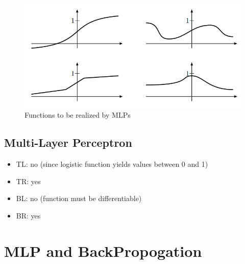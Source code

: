 \documentclass[12pt]{article}
\providecommand{\tightlist}{%
	\setlength{\itemsep}{0pt}\setlength{\parskip}{0pt}}
\begin{document}
\begin{figure}
	\centering

	\includegraphics[width=.75\textwidth]{fig/2018-03-19-13-57-32.png}
	\caption{Functions to be realized by MLPs} \label{fig:mlp3}
\end{figure}

\subsection{Multi-Layer Perceptron}

\begin{itemize}
	\tightlist
	\item TL: no (since logistic function yields values between 0 and 1)
	\item TR: yes
	\item  BL: no (function must be differentiable)
	\item  BR: yes
\end{itemize}

\newpage 
\section{MLP and BackPropogation} \label{sec:3}
\end{document}
